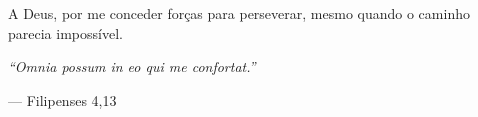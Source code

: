 A Deus, por me conceder forças para perseverar,
mesmo quando o caminho parecia impossível.

\vspace{0.4cm}

\textit{``Omnia possum in eo qui me confortat.''}

\vspace{0.2cm}

\hfill --- Filipenses 4,13

